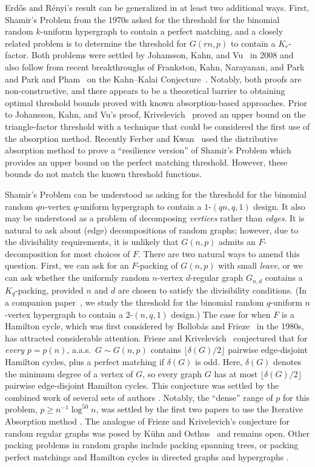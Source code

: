 \documentclass[11pt]{article}
\numberwithin{equation}{section}
\newcounter{i}
\theoremstyle{plain}
\theoremstyle{plain} %
\theoremstyle{definition}
\newcommand{\aas}{a.a.s.\ }
\begin{document}
Erd\H{o}s and R\'{e}nyi's result can be generalized in at least two additional ways. 
First, Shamir's Problem from the 1970s asked for the threshold for the binomial random $k$-uniform hypergraph to contain a perfect matching, and a closely related problem is to determine the threshold for $G(rn, p)$ to contain a $K_r$-factor.  Both problems were settled by Johansson, Kahn, and Vu~\cite{JKV08} in 2008 and also follow from 
recent breakthroughs of Frankston, Kahn, Narayanan, and Park~\cite{FKNP21} and Park and Pham~\cite{PP23} on the Kahn--Kalai Conjecture~\cite{KK07}.
Notably, both proofs are non-constructive, and there appears to be a theoretical barrier to obtaining optimal threshold bounds proved with known absorption-based approaches.  Prior to Johansson, Kahn, and Vu's proof, Krivelevich~\cite{Kr97} proved an upper bound on the triangle-factor threshold with a technique that could be considered the first use of the absorption method. Recently Ferber and Kwan~\cite{FK22} used the distributive absorption method to prove a ``resilience version'' of Shamir's Problem which provides an upper bound on the perfect matching threshold.  However, these bounds do not match the known threshold functions.

Shamir's Problem can be understood as asking for the threshold for the binomial random $qn$-vertex $q$-uniform hypergraph to contain a $1$-$(qn, q, 1)$ design.  
It also may be understood as a problem of decomposing \textit{vertices} rather than \textit{edges}.  It is natural to ask about (edge) decompositions of random graphs; however, due to the divisibility requirements, it is unlikely that $G(n,p)$ admits an $F$-decomposition for most choices of $F$.
There are two natural ways to amend this question.  First, we can ask for an $F$-packing of $G(n,p)$ with small \textit{leave}, or we can ask whether the uniformly random $n$-vertex $d$-regular graph $G_{n,d}$ contains a $K_q$-packing, provided $n$ and $d$ are chosen to satisfy the divisibility conditions.
(In a companion paper~\cite{DKPIV}, we study the threshold for the binomial random $q$-uniform $n$-vertex hypergraph to contain a $2$-$(n, q, 1)$ design.)
The case for when $F$ is a Hamilton cycle, which was first considered by Bollob{\'a}s and Frieze~\cite{BF83} in the 1980s, has attracted considerable attention.  
Frieze and Krivelevich~\cite{FK08} conjectured that for \textit{every} $p = p(n)$, \aas $G\sim G(n,p)$ contains $\lfloor \delta(G) / 2\rfloor$ pairwise edge-disjoint Hamilton cycles, plus a perfect matching if $\delta(G)$ is odd.
Here, $\delta(G)$ denotes the minimum degree of a vertex of $G$, so every graph $G$ has at most $\lfloor \delta(G) / 2\rfloor$ pairwise edge-disjoint Hamilton cycles.
This conjecture was settled by the combined work of several sets of authors \cite{BF83, KS12, KKO15, KO13}.
Notably, the ``dense'' range of $p$ for this problem, $p \geq n^{-1}\log^{50} n$, was settled by the first two papers to use the Iterative Absorption method \cite{KKO15, KO13}.  
The analogue of Frieze and Krivelevich's conjecture for random regular graphs was posed by K\"uhn and Osthus~\cite{KO14} and remains open.
Other packing problems in random graphs include packing spanning trees, or packing perfect matchings and Hamilton cycles in directed graphs and hypergraphs \cite{FLMN17, FS19, FV18, FKL17}.
\end{document}
